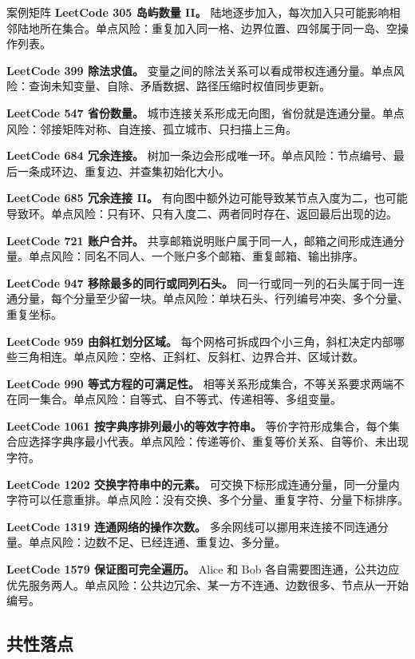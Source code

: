 \begin{principlebox}{案例矩阵}
\textbf{LeetCode 305 岛屿数量 II。}
陆地逐步加入，每次加入只可能影响相邻陆地所在集合。单点风险：重复加入同一格、边界位置、四邻属于同一岛、空操作列表。

\textbf{LeetCode 399 除法求值。}
变量之间的除法关系可以看成带权连通分量。单点风险：查询未知变量、自除、矛盾数据、路径压缩时权值同步更新。

\textbf{LeetCode 547 省份数量。}
城市连接关系形成无向图，省份就是连通分量。单点风险：邻接矩阵对称、自连接、孤立城市、只扫描上三角。

\textbf{LeetCode 684 冗余连接。}
树加一条边会形成唯一环。单点风险：节点编号、最后一条成环边、重复边、并查集初始化大小。

\textbf{LeetCode 685 冗余连接 II。}
有向图中额外边可能导致某节点入度为二，也可能导致环。单点风险：只有环、只有入度二、两者同时存在、返回最后出现的边。

\textbf{LeetCode 721 账户合并。}
共享邮箱说明账户属于同一人，邮箱之间形成连通分量。单点风险：同名不同人、一个账户多个邮箱、重复邮箱、输出排序。

\textbf{LeetCode 947 移除最多的同行或同列石头。}
同一行或同一列的石头属于同一连通分量，每个分量至少留一块。单点风险：单块石头、行列编号冲突、多个分量、重复坐标。

\textbf{LeetCode 959 由斜杠划分区域。}
每个网格可拆成四个小三角，斜杠决定内部哪些三角相连。单点风险：空格、正斜杠、反斜杠、边界合并、区域计数。

\textbf{LeetCode 990 等式方程的可满足性。}
相等关系形成集合，不等关系要求两端不在同一集合。单点风险：自等式、自不等式、传递相等、多组变量。

\textbf{LeetCode 1061 按字典序排列最小的等效字符串。}
等价字符形成集合，每个集合应选择字典序最小代表。单点风险：传递等价、重复等价关系、自等价、未出现字符。

\textbf{LeetCode 1202 交换字符串中的元素。}
可交换下标形成连通分量，同一分量内字符可以任意重排。单点风险：没有交换、多个分量、重复字符、分量下标排序。

\textbf{LeetCode 1319 连通网络的操作次数。}
多余网线可以挪用来连接不同连通分量。单点风险：边数不足、已经连通、重复边、多分量。

\textbf{LeetCode 1579 保证图可完全遍历。}
Alice 和 Bob 各自需要图连通，公共边应优先服务两人。单点风险：公共边冗余、某一方不连通、边数很多、节点从一开始编号。

\end{principlebox}

\subsection{共性落点}

